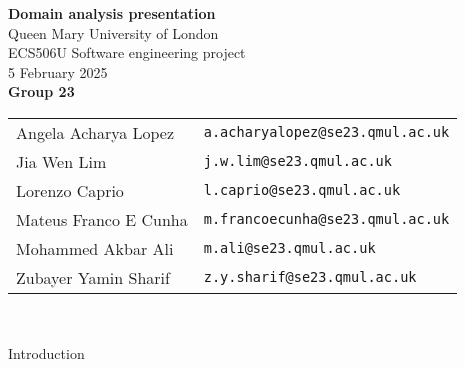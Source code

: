 \documentclass[10pt, aspectratio=169]{beamer}
\begin{document}
\begin{frame}
    \centering
    {\Large\bfseries Domain analysis presentation}
    \\\vspace*{1em}
    Queen Mary University of London \\
    ECS506U Software engineering project \\ 
    5 February 2025 \\
    \vspace*{1em}
    {\bfseries Group 23} \\\vspace{0.25em}
    \begin{tabular}{ll}
        Angela Acharya Lopez & \texttt{a.acharyalopez@se23.qmul.ac.uk} \\
        Jia Wen Lim & \texttt{j.w.lim@se23.qmul.ac.uk} \\
        Lorenzo Caprio & \texttt{l.caprio@se23.qmul.ac.uk} \\
        Mateus Franco E Cunha & \texttt{m.francoecunha@se23.qmul.ac.uk} \\
        Mohammed Akbar Ali & \texttt{m.ali@se23.qmul.ac.uk} \\
        Zubayer Yamin Sharif & \texttt{z.y.sharif@se23.qmul.ac.uk} \\
    \end{tabular} \\
\end{frame}

\begin{frame}{Introduction}
\end{frame}
\end{document}
